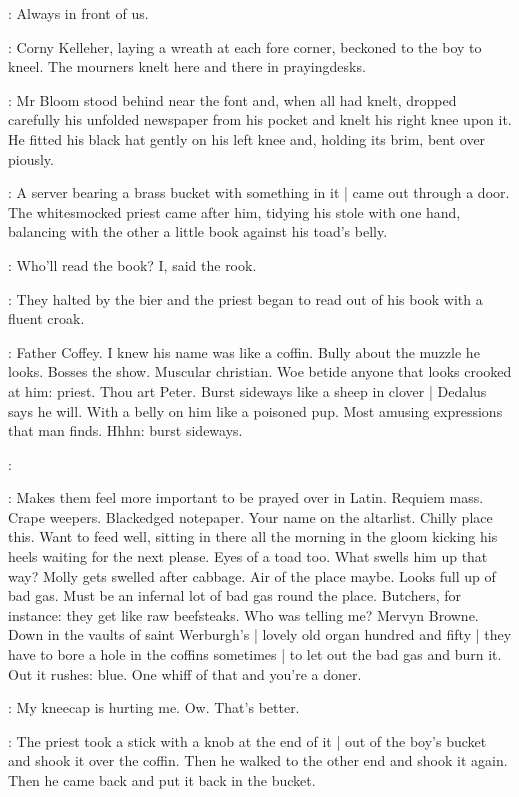 \BloomInt:
Always in front of us.

:
Corny Kelleher, laying a wreath at each fore corner,
beckoned to the boy to kneel.
The mourners knelt here and there in prayingdesks.

:
Mr Bloom stood behind near the font
and, when all had knelt,
dropped carefully his unfolded newspaper from his pocket
and knelt his right knee upon it.
He fitted his black hat gently on his left knee
and, holding its brim, bent over piously.

:
A server bearing a brass bucket with something in it |
came out through a door.
The whitesmocked priest came after him,
tidying his stole with one hand,
balancing with the other a little book against his toad's belly.

\BloomInt:
Who'll read the book?
I, said the rook.

:
They halted by the bier
and the priest began to read out of his book
with a fluent croak.

\BloomInt:
Father Coffey.
I knew his name was like a coffin.
Bully about the muzzle he looks.
Bosses the show.
Muscular christian.
Woe betide anyone that looks crooked at him:
priest.
Thou art Peter.
Burst sideways like a sheep in clover |
Dedalus says he will.
With a belly on him like a poisoned pup.
Most amusing expressions that man finds.
Hhhn:
burst sideways.%

\coffey:

\BloomInt:
Makes them feel more important to be prayed over in Latin.
Requiem mass.
Crape weepers.
Blackedged notepaper.
Your name on the altarlist.
Chilly place this.
Want to feed well, sitting in there all the morning
in the gloom kicking his heels
waiting for the next please.
Eyes of a toad too.
What swells him up that way?
Molly gets swelled after cabbage.
Air of the place maybe.
Looks full up of bad gas.
Must be an infernal lot of bad gas round the place.
Butchers, for instance:
they get like raw beefsteaks.
Who was telling me?
Mervyn Browne.
Down in the vaults of saint Werburgh's |
lovely old organ hundred and fifty |
they have to bore a hole in the coffins sometimes |
to let out the bad gas and burn it.
Out it rushes:
blue.
One whiff of that and you're a doner.

\BloomInt:
My kneecap is hurting me.
Ow.
That's better.

:
The priest took a stick with a knob at the end of it |
out of the boy's bucket and shook it over the coffin.
Then he walked to the other end and shook it again.
Then he came back and put it back in the bucket.

